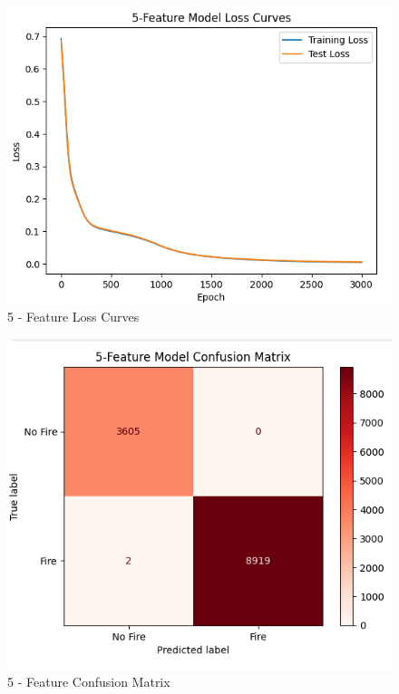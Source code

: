\documentclass[conference]{IEEEtran}
\begin{document}
\begin{figure}
    \centering
    \includegraphics[width=0.75\linewidth]{images/5LC.png}
    \caption{5 - Feature Loss Curves}
    \label{fig:4.1}
\end{figure}

\begin{figure}
    \centering
    \includegraphics[width=0.75\linewidth]{images/5CM.png}
    \caption{5 - Feature Confusion Matrix}
    \label{fig:4.2}
\end{figure}
\end{document}
